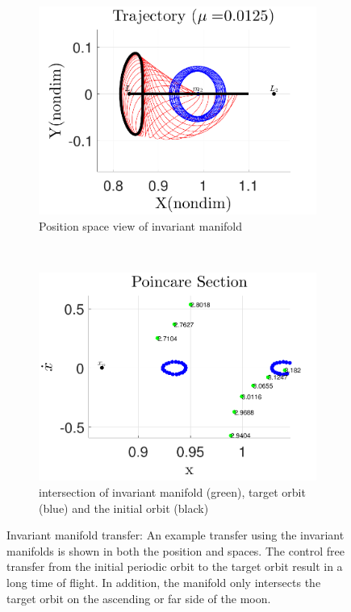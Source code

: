 \documentclass[smallcondensed]{svjour3}
\begin{document}
\begin{figure} 
        \centering 
        \begin{subfigure}[htbp]{0.5\textwidth} 
                \includegraphics[width=\textwidth]{manifold_trajectory} 
                \caption{Position space view of invariant manifold} \label{fig:manifold_trajectory} 
        \end{subfigure}~ %
        \begin{subfigure}[htbp]{0.5\textwidth} 
                \includegraphics[width=\textwidth]{manifold_poincare} 
                \caption{\Poincare intersection of invariant manifold (green), target orbit (blue) and the initial orbit (black)} \label{fig:manifold_poincare} 
        \end{subfigure} 
        \caption{Invariant manifold transfer: An example transfer using the invariant manifolds is shown in both the position and \Poincare spaces.
        The control free transfer from the initial periodic orbit to the target orbit result in a long time of flight. 
    In addition, the manifold only intersects the target orbit on the ascending or far side of the moon.}
        \label{fig:invariant_manifold_transfer} 
\end{figure}
\end{document}
